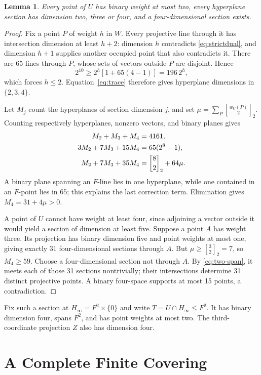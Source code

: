 \documentclass[12pt,letterpaper,onecolumn]{article}
\newtheorem{lemma}[theorem]{Lemma}
\theoremstyle{definition}
\begin{document}
\begin{lemma}\label{lem:entrance}
Every point of $U$ has binary weight at most two, every hyperplane section has dimension two, three or four, and a four-dimensional section exists.
\end{lemma}
\begin{proof}
Fix a point $P$ of weight $h$ in $W$. Every projective line through it has intersection dimension at least $h+2$: dimension $h$ contradicts \eqref{eq:strictdual}, and dimension $h+1$ supplies another occupied point that also contradicts it. There are 65 lines through $P$, whose sets of vectors outside $P$ are disjoint. Hence
\[
 2^{10}\ge2^h[1+65(4-1)]=196\,2^h,
\]
which forces $h\le2$. Equation~\eqref{eq:trace} therefore gives hyperplane dimensions in $\{2,3,4\}$.

Let $M_j$ count the hyperplanes of section dimension $j$, and set $\mu=\sum_P {w_U(P)\brack2}_2$. Counting respectively hyperplanes, nonzero vectors, and binary planes gives
\begin{align}
 M_2+M_3+M_4&=4161,\notag\\
 3M_2+7M_3+15M_4&=65(2^8-1),\notag\\
 M_2+7M_3+35M_4&={8\brack2}_2+64\mu.\notag
\end{align}
A binary plane spanning an $F$-line lies in one hyperplane, while one contained in an $F$-point lies in 65; this explains the last correction term. Elimination gives $M_4=31+4\mu>0$.

A point of $U$ cannot have weight at least four, since adjoining a vector outside it would yield a section of dimension at least five. Suppose a point $A$ has weight three. Its projection has binary dimension five and point weights at most one, giving exactly 31 four-dimensional sections through $A$. But $\mu\ge{3\brack2}_2=7$, so $M_4\ge59$. Choose a four-dimensional section not through $A$. By \eqref{eq:two-span}, it meets each of those 31 sections nontrivially; their intersections determine 31 distinct projective points. A binary four-space supports at most 15 points, a contradiction.
\end{proof}

Fix such a section at $H_\infty=F^2\times\{0\}$ and write $T=U\cap H_\infty\le F^2$. It has binary dimension four, spans $F^2$, and has point weights at most two. The third-coordinate projection $Z$ also has dimension four.

\section{A Complete Finite Covering}
\end{document}
